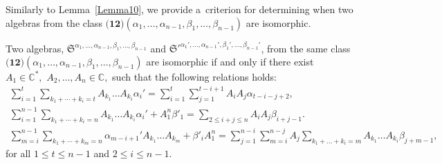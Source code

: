 \documentclass{jonasart}
\begin{document}
	Similarly to Lemma~\ref{Lemma10}, we provide a~criterion for determining when two algebras from the class $\textbf{(12)}(\alpha_1,\dots, \alpha_{n-1}, \beta_1,\dots, \beta_{n-1})$ are isomorphic.

	\begin{lemma}\label{lem16} 
    Two algebras, $\mathfrak{S}^{\alpha_1,\dots,\alpha_{n-1}, \beta_{1},\dots, \beta_{n-1}}$ and $\mathfrak{S}'^{\alpha_1 ',\dots,\alpha_{n-1}', \beta_{1}',\dots, \beta_{n-1}'}$, from the same class $\textbf{(12)}(\alpha_1,\dots, \alpha_{n-1}, \beta_1,\dots, \beta_{n-1})$ are isomorphic if and only if there exist $A_1 \in \mathbb{C}^*,$ $A_2, \dots, A_n \in \mathbb{C},$ such that the following relations holds:
    \begin{gather*}
        \sum_{i=1}^t\sum_{k_1 +\cdots+k_i =t} A_{k_1} \dots A_{k_i}\alpha_i ' = \sum_{i=1}^{t} \sum_{j=1}^{t-i+1} A_i A_j \alpha_{t-i-j+2}, \\
        \sum_{i=1}^{n-1} \sum_{k_1 +\cdots+k_i =n} A_{k_1} \dots A_{k_i} \alpha_i ' + A_1^n \beta'_{1} = \sum_{2\leq i+j\leq n} A_i A_j \beta_{i+j-1}. \\
        \sum_{m=i}^{n-1} \sum_{k_1 +\cdots+k_m =n} \alpha_{m-i+1}' A_{k_1} \dots A_{k_m} +\beta'_{i} A_1^n = \sum_{j=1}^{n-i} \sum_{m=i}^{n-j} A_j \sum_{k_1 + \dots +k_i =m} A_{k_1} \dots A_{k_i} \beta_{j+m-1},
    \end{gather*}
    for all $1 \leq t \leq n-1$ and $2 \leq i \leq n-1$.
	\end{lemma}
\end{document}
